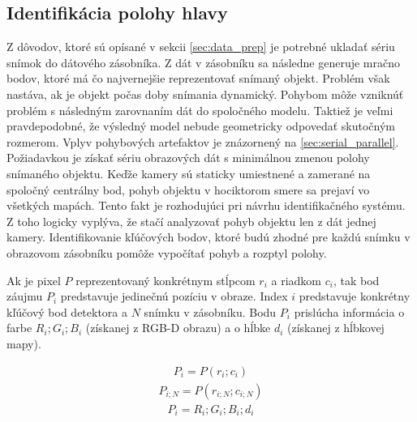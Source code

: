 \subsection{Identifikácia polohy hlavy}

Z dôvodov, ktoré sú opísané v sekcii \ref{sec:data_prep} je potrebné ukladať sériu snímok do dátového zásobníka. Z dát v zásobníku sa následne generuje mračno bodov, ktoré má čo najvernejšie reprezentovať snímaný objekt. Problém však nastáva, ak je objekt počas doby snímania dynamický. Pohybom môže vzniknúť problém s následným zarovnaním dát do spoločného modelu. Taktiež je veľmi pravdepodobné, že výsledný model nebude geometricky odpovedať skutočným rozmerom. Vplyv pohybových artefaktov je znázornený na \ref{sec:serial_parallel}. Požiadavkou je získať sériu obrazových dát s minimálnou zmenou polohy snímaného objektu.  
Keďže kamery sú staticky umiestnené a zamerané na spoločný centrálny bod, pohyb objektu v hociktorom smere sa prejaví vo všetkých mapách. Tento fakt je rozhodujúci pri návrhu identifikačného systému. Z toho logicky vyplýva, že stačí analyzovať pohyb objektu len z dát jednej kamery. Identifikovanie kľúčových bodov, ktoré budú zhodné pre každú snímku v obrazovom zásobníku pomôže vypočítať pohyb a rozptyl polohy. \newline

Ak je pixel $P$ reprezentovaný konkrétnym stĺpcom $r_{i}$ a riadkom $c_{i}$, tak bod záujmu $P_{i}$ predstavuje jedinečnú pozíciu v obraze. Index $i$ predstavuje konkrétny kľúčový bod detektora a $N$ snímku v zásobníku. Bodu $P_{i}$ prislúcha informácia o farbe $R_{i};G_{i};B_{i}$ (získanej z RGB-D obrazu) a o hĺbke $d_{i}$ (získanej z hĺbkovej mapy).

\begin{equation}
\label{eq:pixels:a}
\begin{aligned}
P_{i}=P\left(r_{i};c_{i}\right)
\end{aligned}
\end{equation}
\begin{equation}
\label{eq:pixels:b}
\begin{aligned}
P_{i;N}=P\left(r_{i;N};c_{i;N}\right)
\end{aligned}
\end{equation}
\begin{equation}
\label{eq:pixels:c}
\begin{aligned}
P_{i}=R_{i};G_{i};B_{i};d_{i}
\end{aligned}
\end{equation}

